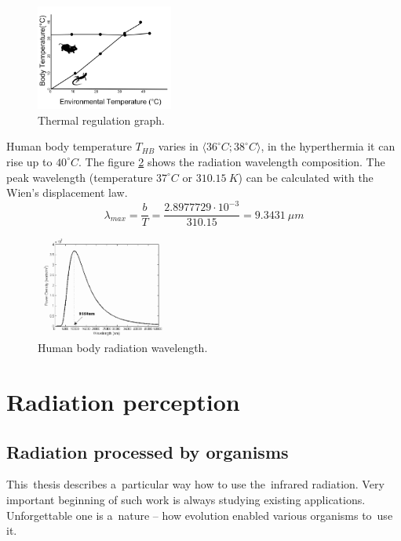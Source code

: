 \begin{figure}[h!]
\begin{center}
\includegraphics[width=0.4\textwidth]{obrazky-figures/thermoregulatory.png}
\caption{Thermal regulation graph.\label{fig:thermoregulatory}}
\end{center}    
\end{figure}

Human body temperature $T_{HB}$ varies in $\langle 36^{\circ}C; 38^{\circ}C \rangle$, in the hyperthermia
it can rise up to $40^{\circ}C$. The figure \ref{fig:bodywavelength} shows the radiation wavelength composition.
The peak wavelength (temperature $37^{\circ}C$ or $310.15~K$) can be calculated with the Wien's displacement law.
$$\lambda_{max}=\frac{b}{T}=\frac{2.8977729 \cdot 10^{-3}}{310.15} = 9.3431~\mu m$$

\begin{figure}[h!]
\begin{center}
\includegraphics[width=0.4\textwidth]{obrazky-figures/bodyradiation.png}
\caption{Human body radiation wavelength.\cite{BodyRadiation}\label{fig:bodywavelength}}
\end{center}    
\end{figure}





\newpage
\section{Radiation perception}

\subsection*{Radiation processed by organisms}
This~thesis describes a~particular way how to use the~infrared radiation. Very important beginning of such
work is always studying existing applications. Unforgettable one is a~nature -- how evolution enabled 
various organisms to~use it.

